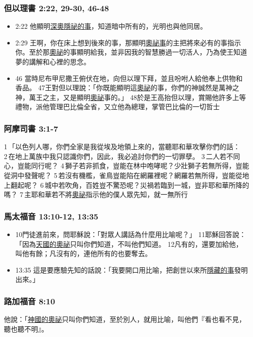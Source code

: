 \subsubsection{但以理書 2:22, 29-30, 46-48}
\begin{itemize} 
\itemsep-.25em
\item 2:22 他顯明\underline{深奧隱祕的事}，知道暗中所有的，光明也與他同居。
\item 2:29 王啊，你在床上想到後來的事，那顯明\underline{奧祕事}的主把將來必有的事指示你。至於那\underline{奧祕}的事顯明給我，並非因我的智慧勝過一切活人，乃為使王知道夢的講解和心裡的思念。
\item 46 當時尼布甲尼撒王俯伏在地，向但以理下拜，並且吩咐人給他奉上供物和香品。 47王對但以理說：「你既能顯明這\underline{奧祕}的事，你們的神誠然是萬神之神，萬王之主，又是顯明\underline{奧祕}事的。」 48於是王高抬但以理，賞賜他許多上等禮物，派他管理巴比倫全省，又立他為總理，掌管巴比倫的一切哲士
\end{itemize}

\subsubsection{阿摩司書 3:1-7}
1 「以色列人哪，你們全家是我從埃及地領上來的，當聽耶和華攻擊你們的話： 2 在地上萬族中我只認識你們，因此，我必追討你們的一切罪孽。 3 二人若不同心，豈能同行呢？ 4 獅子若非抓食，豈能在林中咆哮呢？少壯獅子若無所得，豈能從洞中發聲呢？ 5 若沒有機檻，雀鳥豈能陷在網羅裡呢？網羅若無所得，豈能從地上翻起呢？ 6 城中若吹角，百姓豈不驚恐呢？災禍若臨到一城，豈非耶和華所降的嗎？ 7 主耶和華若不將\underline{奧祕}指示他的僕人眾先知，就一無所行


\subsubsection{馬太福音 13:10-12, 13:35}
\begin{itemize} 
\itemsep-.25em
\item 10門徒進前來，問耶穌說：「對眾人講話為什麼用比喻呢？」 11耶穌回答說：「因為\underline{天國的奧祕}只叫你們知道，不叫他們知道。 12凡有的，還要加給他，叫他有餘；凡沒有的，連他所有的也要奪去。
\item 13:35 這是要應驗先知的話說：「我要開口用比喻，把創世以來所\underline{隱藏的事}發明出來。」
\end{itemize} 

\subsubsection{路加福音 8:10}
他說：「\underline{神國的奧祕}只叫你們知道，至於別人，就用比喻，叫他們『看也看不見，聽也聽不明』。

